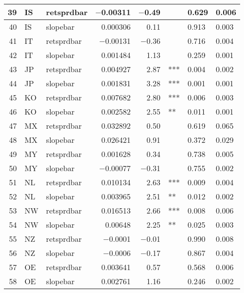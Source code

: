 \begin{longtable}{|r|l|l|r|r|l|l|l|}
   39 &    IS &    retsprdbar &    $-$0.00311 &    $-$0.49 &      &    0.629 &    0.006\\\hline
   40 &    IS &    slopebar &    0.000306 &    0.11 &      &    0.913 &    0.003\\\hline
   41 &    IT &    retsprdbar &    $-$0.00131 &    $-$0.36 &      &    0.716 &    0.004\\\hline
   42 &    IT &    slopebar &    0.001484 &    1.13 &      &    0.259 &    0.001\\\hline
   43 &    JP &    retsprdbar &    0.004927 &    2.87 &    *** &    0.004 &    0.002\\\hline
   44 &    JP &    slopebar &    0.001831 &    3.28 &    *** &    0.001 &    0.001\\\hline
   45 &    KO &    retsprdbar &    0.007682 &    2.80 &    *** &    0.006 &    0.003\\\hline
   46 &    KO &    slopebar &    0.002582 &    2.55 &    ** &    0.011 &    0.001\\\hline
   47 &    MX &    retsprdbar &    0.032892 &    0.50 &      &    0.619 &    0.065\\\hline
   48 &    MX &    slopebar &    0.026421 &    0.91 &      &    0.372 &    0.029\\\hline
   49 &    MY &    retsprdbar &    0.001628 &    0.34 &      &    0.738 &    0.005\\\hline
   50 &    MY &    slopebar &    $-$0.00077 &    $-$0.31 &      &    0.755 &    0.002\\\hline
   51 &    NL &    retsprdbar &    0.010134 &    2.63 &    *** &    0.009 &    0.004\\\hline
   52 &    NL &    slopebar &    0.003965 &    2.51 &    ** &    0.012 &    0.002\\\hline
   53 &    NW &    retsprdbar &    0.016513 &    2.66 &    *** &    0.008 &    0.006\\\hline
   54 &    NW &    slopebar &    0.00648 &    2.25 &    ** &    0.025 &    0.003\\\hline
   55 &    NZ &    retsprdbar &    $-$0.0001 &    $-$0.01 &      &    0.990 &    0.008\\\hline
   56 &    NZ &    slopebar &    $-$0.0006 &    $-$0.17 &      &    0.867 &    0.004\\\hline
   57 &    OE &    retsprdbar &    0.003641 &    0.57 &      &    0.568 &    0.006\\\hline
   58 &    OE &    slopebar &    0.002761 &    1.16 &      &    0.246 &    0.002\\\hline

\end{longtable}
